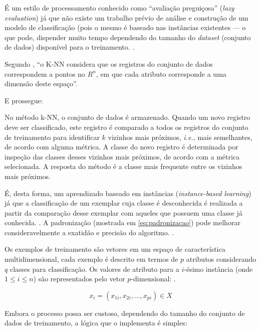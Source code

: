 É um estilo de processamento conhecido como ``avaliação preguiçosa'' (\textit{lazy evaluation}) já que não existe um trabalho prévio de análise e construção de um modelo de classificação (pois o mesmo é baseado nas instâncias existentes --- o que pode, dispender muito tempo dependendo do tamanho do \textit{dataset} (conjunto de dados) disponível para o treinamento. \cite{Boscarioli2017}.

Segundo \cite{goldschmidt2005}, ``o K-NN considera que os registros do conjunto de dados correspondem a pontos no $R^n$, em que cada atributo corresponde a uma dimensão deste espaço''.

E prossegue: 
\begin{citacao}
	No método k-NN, o conjunto de dados é armazenado. Quando um novo registro deve ser classificado, este registro é comparado a todos os registros do conjunto de treinamento para identificar $k$ vizinhos mais próximos, \textit{i.e.}, mais semelhantes, de acordo com alguma métrica. A classe do novo registro é determinada por inspeção das classes desses vizinhos mais próximos, de acordo com a métrica selecionada. A resposta do método é a classe mais frequente entre os vizinhos mais próximos.
\end{citacao}	

É, desta forma, um aprendizado baseado em instâncias (\textit{instance-based learning}) já que a classificação de um exemplar cuja classe é desconhecida é realizada a partir da comparação desse exemplar com aqueles que possuem uma classe já conhecida. \cite[p. 80]{Boscarioli2017}. A padronização (mostrada em \autoref{eq:padronizacao}) pode melhorar consideravelmente a exatidão e precisão do algoritmo. \cite{bruce_estatistica_2019}.


Os exemplos de treinamento são vetores em um espaço de característica multidimensional, cada exemplo é descrito em termos de $p$ atributos considerando $q$  classes para classificação. Os valores de atributo para a  $i$-ésimo instância (onde $1 \leq i \leq n$) são representados pelo vetor $p$-dimensional: \cite{bruce_estatistica_2019} \cite{alpaydin_introduction_2014} \cite{classification2013}.

\begin{equation}
x_{i}=(x_{1i},x_{2i},...,x_{pi})\in X
\end{equation}

Embora o processo possa ser custoso, dependendo do tamanho do conjunto de dados de treinamento, a lógica que o implementa é simples: \cite{Boscarioli2017} \cite{bruce_estatistica_2019} \cite{goldschmidt2005}

